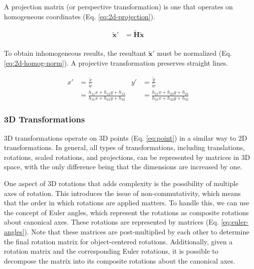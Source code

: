 A projection matrix (or perspective transformation) is one that operates on homogeneous coordinates (Eq. \ref{eq:2d-projection}).

\begin{equation}
    \begin{aligned}
        \tilde{\mathbf{x}}' &= \tilde{\mathbf{H}}\tilde{\mathbf{x}}\\
    \end{aligned}
    \label{eq:2d-projection}
\end{equation}

To obtain inhomogeneous results, the resultant $\tilde{\mathbf{x}}'$ must be normalized (Eq. \ref{eq:2d-homog-norm}). A projective transformation preserves straight lines.

\begin{equation}
    \begin{aligned}
        x'&= \frac{\tilde{x}}{\tilde{w}}  &  y' &= \frac{\tilde{y}}{\tilde{w}}\\
        &= \frac{h_{11}x + h_{12}y + h_{13}}{h_{31}x + h_{32}y + h_{33}} &  &= \frac{h_{21}x + h_{22}y + h_{23}}{h_{31}x + h_{32}y + h_{33}}
    \end{aligned}
    \label{eq:2d-homog-norm}
\end{equation}

\subsubsection{3D Transformations}
\label{sec:3d-transformations}

3D transformations operate on 3D points (Eq. \ref{eq:point}) in a similar way to 2D transformations. In general, all types of transformations, including translations, rotations, scaled rotations, and projections, can be represented by matrices in 3D space, with the only difference being that the dimensions are increased by one.

One aspect of 3D rotations that adds complexity is the possibility of multiple axes of rotation. This introduces the issue of non-commutativity, which means that the order in which rotations are applied matters. To handle this, we can use the concept of Euler angles, which represent the rotations as composite rotations about canonical axes. These rotations are represented by matrices (Eq. \ref{eq:euler-angles}). Note that these matrices are post-multiplied by each other to determine the final rotation matrix for object-centered rotations. Additionally, given a rotation matrix and the corresponding Euler rotations, it is possible to decompose the matrix into its composite rotations about the canonical axes.

